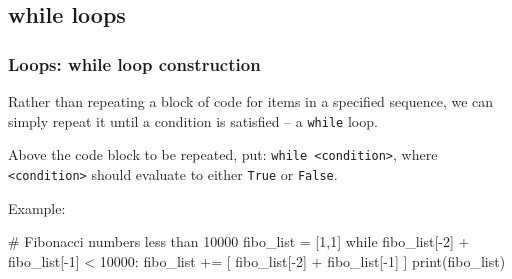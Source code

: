 \documentclass{beamer}
\newenvironment{codeblock}
    {\hfill\begin{beamerboxesrounded}[lower=codecol, width=0.8\textwidth]
    \medskip

    }
    { 
    \end{beamerboxesrounded}\hfill
    }
\theoremstyle{example}
\newcommand{\ttt}[1]{{\small\texttt{#1}}}
\begin{document}
\subsection{while loops}
\begin{frame}[fragile]
\frametitle{Loops: {\ttm while} loop construction}

Rather than repeating a block of code for items in a specified sequence, we can simply repeat it until a condition is satisfied {--} a \ttt{while} loop.

\vspace*{12pt}
Above the code block to be repeated, put: \ttt{while <condition>}, where \ttt{<condition>} should evaluate to either \ttt{True} or \ttt{False}.

Example:
\vspace*{12pt}

\begin{codeblock}

\begin{python}
# Fibonacci numbers less than 10000
fibo_list = [1,1]
while fibo_list[-2] + fibo_list[-1] < 10000:
    fibo_list += [ fibo_list[-2] + fibo_list[-1] ]
print(fibo_list)
\end{python}

\end{codeblock}

\end{frame}
\end{document}
